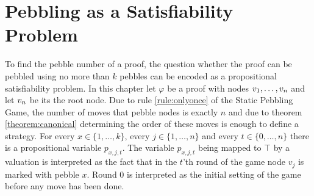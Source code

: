 \section{Pebbling as a Satisfiability Problem}
\label{sec:pebblingSAT}

To find the pebble number of a proof, the question whether the proof can be pebbled using no more than $k$ pebbles can be encoded as a propositional satisfiability problem.
In this chapter let $\varphi$ be a proof with nodes $v_1,\ldots,v_n$ and let $v_n$ be its the root node. 
Due to rule \ref{rule:onlyonce} of the Static Pebbling Game, the number of moves that pebble nodes is exactly $n$ and due to theorem \ref{theorem:canonical} determining the order of these moves is enough to define a strategy. 
For every $x \in \{1,\ldots,k\}$, every $j \in \{1,\ldots,n\}$ and every $t \in \{0,\ldots,n\}$ there is a propositional variable $p_{x,j,t}$. 
The variable $p_{x,j,t}$ being mapped to $\top$ by a valuation is interpreted as the fact that in the $t$'th round of the game node $v_j$ is marked with pebble $x$.
Round $0$ is interpreted as the initial setting of the game before any move has been done.
